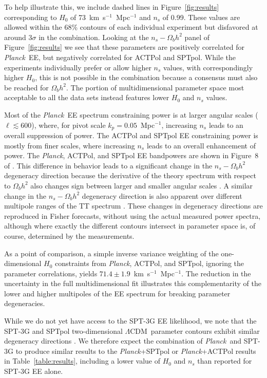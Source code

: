 \documentclass[twocolumn]{aastex63}
\newcommand{\planck}{\textsl{Planck}}
\newcommand{\lcdm}{\ensuremath{\Lambda\mathrm{CDM}}}
\begin{document}
To help illustrate this, we include dashed lines in Figure~\ref{fig:results} corresponding to $H_0$ of 73~km~s$^{-1}$~Mpc$^{-1}$ and $n_s$ of 0.99. These values are allowed within the 68\% contours of each individual experiment but disfavored at around $3\sigma$ in the combination. Looking at the $n_s-\Omega_bh^2$ panel of Figure~\ref{fig:results} we see that these parameters are positively correlated for \planck\ EE, but negatively correlated for ACTPol and SPTpol. While the experiments individually prefer or allow higher $n_s$ values, with correspondingly higher $H_0$, this is not possible in the combination because a consensus must also be reached for $\Omega_bh^2$. The portion of multidimensional parameter space most acceptable to all the data sets instead features lower $H_0$ and $n_s$ values. 

Most of the \planck\ EE spectrum constraining power is at larger angular scales ($\ell\lesssim600$), where, for pivot scale $k_p=0.05$~Mpc$^{-1}$, increasing $n_s$ leads to an overall suppression of power. The ACTPol and SPTpol EE constraining power is mostly from finer scales, where increasing $n_s$ leads to an overall enhancement of power. The \planck, ACTPol, and SPTpol EE bandpowers are shown in Figure~8 of \cite{dutcher/etal:prep}. This difference in behavior leads to a significant change in the $n_s-\Omega_bh^2$ degeneracy direction because the derivative of the theory spectrum with respect to $\Omega_bh^2$ also changes sign between larger and smaller angular scales \citep[Fig.~1 of][]{galli/etal:2014}. A similar change in the $n_s-\Omega_bh^2$ degeneracy direction is also apparent over different multipole ranges of the TT spectrum \citep[e.g., Fig.~1 of][]{addison/etal:2016}. These changes in degeneracy directions are reproduced in Fisher forecasts, without using the actual measured power spectra, although where exactly the different contours intersect in parameter space is, of course, determined by the measurements.

As a point of comparison, a simple inverse variance weighting of the one-dimensional $H_0$ constraints from \planck, ACTPol, and SPTpol, ignoring the parameter correlations, yields $71.4\pm1.9$~km~s$^{-1}$~Mpc$^{-1}$. The reduction in the uncertainty in the full multidimensional fit illustrates this complementarity of the lower and higher multipoles of the EE spectrum for breaking parameter degeneracies.

While we do not yet have access to the SPT-3G EE likelihood, we note that the SPT-3G and SPTpol two-dimensional \lcdm\ parameter contours exhibit similar degeneracy directions \citep[Fig.~9 of][]{dutcher/etal:prep}. We therefore expect the combination of \planck\ and SPT-3G to produce similar results to the \planck+SPTpol or \planck+ACTPol results in Table~\ref{table:results}, including a lower value of $H_0$ and $n_s$ than reported for SPT-3G EE alone.
\end{document}
